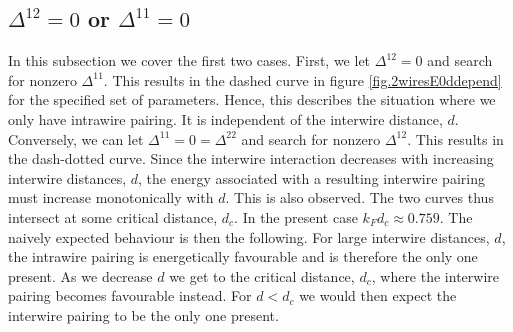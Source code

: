 \subsection{\texorpdfstring{$\Delta^{12} = 0$ or $\Delta^{11} = 0$}{Zero inter- or intrawire pairing}}
In this subsection we cover the first two cases. First, we let $\Delta^{12} = 0$ and search for nonzero $\Delta^{11}$. This results in the dashed curve in figure \ref{fig.2wiresE0ddepend} for the specified set of parameters. Hence, this describes the situation where we only have intrawire pairing. It is independent of the interwire distance, $d$. Conversely, we can let $\Delta^{11} = 0 = \Delta^{22}$ and search for nonzero $\Delta^{12}$. This results in the dash-dotted curve. Since the interwire interaction decreases with increasing interwire distances, $d$, the energy associated with a resulting interwire pairing must increase monotonically with $d$. This is also observed. The two curves thus intersect at some critical distance, $d_c$. In the present case $k_Fd_c \approx 0.759$. The naively expected behaviour is then the following. For large interwire distances, $d$, the intrawire pairing is energetically favourable and is therefore the only one present. As we decrease $d$ we get to the critical distance, $d_c$, where the interwire pairing becomes favourable instead. For $d < d_c$ we would then expect the interwire pairing to be the only one present. 

